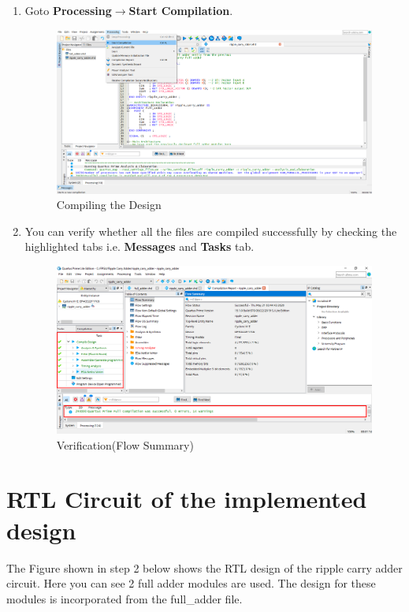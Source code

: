 \documentclass[12pt,singleside,a4paper]{article}
\begin{document}
\begin{enumerate}
    \item Goto \textbf{Processing}$\rightarrow$\textbf{Start Compilation}.
    \begin{figure}[H]
        \centering
    \includegraphics[width=14cm,keepaspectratio]{img7.png}
    \caption{Compiling the Design}
    \end{figure}
    \newpage
    \item You can verify whether all the files are compiled successfully by checking the highlighted tabs i.e. \textbf{Messages} and \textbf{Tasks} tab.
    \begin{figure}[H]
        \centering
    \includegraphics[width=14cm,keepaspectratio]{img8.png}
    \caption{Verification(Flow Summary)}
    \end{figure}
    
\end{enumerate}
\newpage
\section{RTL Circuit of the implemented design}
The Figure shown in step 2 below shows the RTL design of the ripple carry adder circuit. Here you can see 2 full adder modules are used. The design for these modules is incorporated from the full\_adder file.
\end{document}
